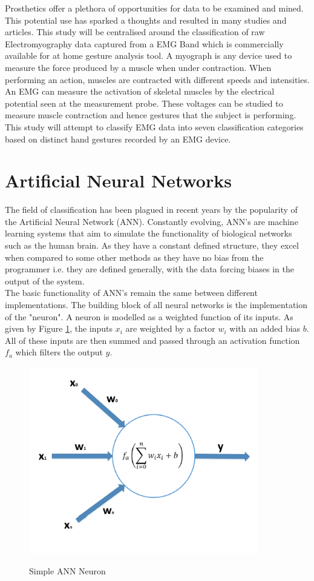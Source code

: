 \documentclass[11pt]{article}
\begin{document}
	\noindent
	Prosthetics offer a plethora of opportunities for data to be examined and mined. This potential use has sparked a thoughts and resulted in many studies and articles. This study will be centralised around the classification of raw Electromyography data captured from a EMG Band which is commercially available for at home gesture analysis tool. A myograph is any device used to measure the force produced by a muscle when under contraction. When performing an action, muscles are contracted with different speeds and intensities. An EMG can measure the activation of skeletal muscles by the electrical potential seen at the measurement probe. These voltages can be studied to measure muscle contraction and hence gestures that the subject is performing. This study will attempt to classify EMG data into seven classification categories based on distinct hand gestures recorded by an EMG device.
	
	\section{Artificial Neural Networks}
	The field of classification has been plagued in recent years by the popularity of the Artificial Neural Network (ANN). Constantly evolving, ANN's are machine learning systems that aim to simulate the functionality of biological networks such as the human brain. As they have a constant defined structure, they excel when compared to some other methods as they have no bias from the programmer i.e. they are defined generally, with the data forcing biases in the output of the system.\\
	
	\noindent
	The basic functionality of ANN's remain the same between different implementations. The building block of all neural networks is the implementation of the "neuron". A neuron is modelled as a weighted function of its inputs. As given by Figure \ref{fig:neuron}, the inputs $x_i$ are weighted by a factor $w_i$ with an added bias $b$. All of these inputs are then summed and passed through an activation function $f_a$ which filters the output $y$.\\
	
	\begin{figure}[H]
		\centering
		\includegraphics[width=10cm]{Figures/neuron}
		\caption{Simple ANN Neuron}\cite{Bonaccorso2017}
		\label{fig:neuron}
	\end{figure}
\end{document}

